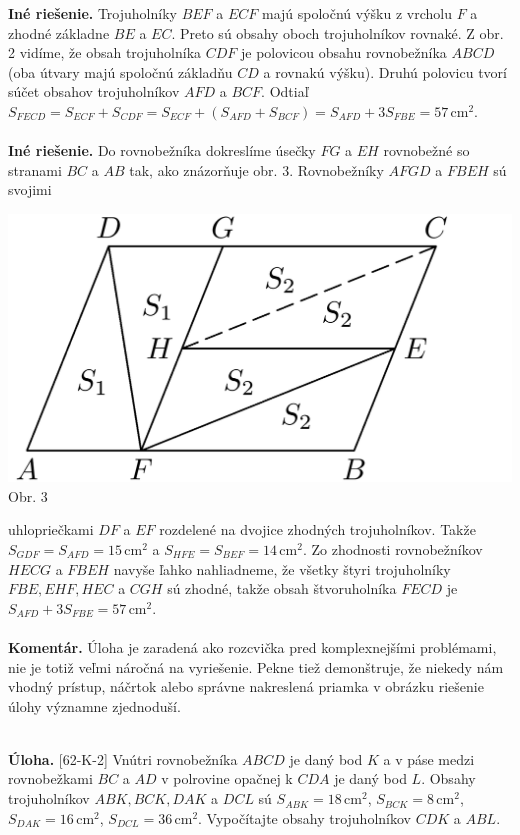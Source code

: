 \documentclass[11pt,a4paper,oneside,final]{book}
\newcommand{\kom}{\textbf{Komentár.} }
\newcommand{\ul}{\textbf{Úloha.} }
\begin{document}
\textbf{Iné riešenie.} Trojuholníky $BEF$ a $ECF$ majú spoločnú výšku z vrcholu $F$ a zhodné základne $BE$ a $EC$. Preto sú obsahy oboch trojuholníkov rovnaké. Z obr. 2 vidíme, že obsah trojuholníka $CDF$ je polovicou obsahu rovnobežníka $ABCD$ (oba útvary majú spoločnú základňu $CD$ a rovnakú výšku). Druhú polovicu tvorí súčet obsahov trojuholníkov $AFD$ a $BCF$. Odtiaľ $S_{FECD} = S_{ECF} + S_{CDF} = S_{ECF} + (S_{AFD} + S_{BCF}) = S_{AFD} + 3 S_{FBE} = 57$\,cm$^2$.\\
\\
\textbf{Iné riešenie.} Do rovnobežníka dokreslíme úsečky $FG$ a $EH$ rovnobežné so stranami $BC$ a $AB$ tak, ako znázorňuje obr. 3. Rovnobežníky $AFGD$ a $FBEH$ sú svojimi
\begin{center}
\includegraphics[scale=0.3]{57S23}\\

Obr. 3
\end{center}
uhlopriečkami $DF$ a $EF$ rozdelené na dvojice zhodných trojuholníkov. Takže $S_{GDF} = S_{AFD} = 15$\,cm$^2$ a $S_{HFE} = S_{BEF} = 14$\,cm$^2$. Zo zhodnosti rovnobežníkov $HECG$ a $FBEH$ navyše ľahko nahliadneme, že všetky štyri trojuholníky $FBE, EHF, HEC$ a $CGH$ sú zhodné, takže obsah štvoruholníka $FECD$ je $S_{AFD} + 3S_{FBE} = 57$\,cm$^2$.\\
\\
\kom Úloha je zaradená ako rozcvička pred komplexnejšími problémami, nie je totiž veľmi náročná na vyriešenie. Pekne tiež demonštruje, že niekedy nám vhodný prístup, náčrtok alebo správne nakreslená priamka v obrázku riešenie úlohy významne zjednoduší.\\
\\
\begin{tcolorbox}[breakable,notitle,boxrule=0pt,colback=light-gray,colframe=light-gray]\ul [62-K-2] Vnútri rovnobežníka $ABCD$ je daný bod $K$ a v páse medzi rovnobežkami $BC$ a $AD$ v polrovine opačnej k $CDA$ je daný bod $L$. Obsahy trojuholníkov $ABK, BCK, DAK$ a $DCL$ sú $S_{ABK} = 18$\,cm$^2$, $S_{BCK} = 8$\,cm$^2$, $S_{DAK} = 16$\,cm$^2$, $S_{DCL} = 36$\,cm$^2$. Vypočítajte obsahy trojuholníkov $CDK$ a $ABL$.

\end{tcolorbox}
\end{document}
